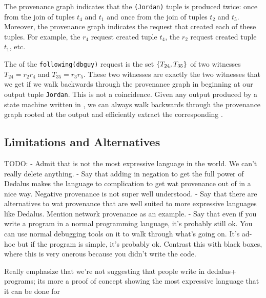 The provenance graph indicates that the \texttt{(Jordan)} tuple is produced
twice: once from the join of tuples $t_4$ and $t_1$ and once from the join of
tuples $t_2$ and $t_5$. Moreover, the provenance graph indicates the request
that created each of these tuples. For example, the $r_4$ request created tuple
$t_4$, the $r_2$ request created tuple $t_1$, etc.

The \watprovenance{} of the \texttt{following(dbguy)} request is the set
$\{T_{24}, T_{35}\}$ of two witnesses $T_{24} = r_2r_4$ and $T_{35} =
r_3r_5$. These two witnesses are exactly the two witnesses that we get if we
walk backwards through the provenance graph in 
beginning at our output tuple \texttt{Jordan}. This is not a coincidence. Given
any output produced by a state machine written in \dedalusplus{}, we can always
walk backwards through the provenance graph rooted at the output and
efficiently extract the corresponding \watprovenance{}.

\subsection{Limitations and Alternatives}
TODO:
  - Admit that \dedalusplus{} is not the most expressive language in the world.
    We can't really delete anything.
  - Say that adding in negation to get the full power of Dedalus makes the
    language to complication to get wat provenance out of in a nice way.
    Negative provenance is not super well understood.
  - Say that there are alternatives to wat provenance that are well suited to
    more expressive languages like Dedalus. Mention network provenance as an
    example.
  - Say that even if you write a program in a normal programming language, it's
    probably still ok. You can use normal debugging tools on it to walk through
    what's going on. It's ad-hoc but if the program is simple, it's probably
    ok.  Contrast this with black boxes, where this is very onerous because you
    didn't write the code.

Really emphasize that we're not suggesting that people write in dedalus+ programs; its more a proof of concept showing the most expressive language that it can be done for
